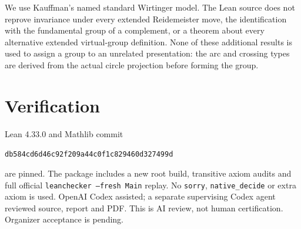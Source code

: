 \documentclass[11pt]{article}
\begin{document}
We use Kauffman's named standard Wirtinger model. The Lean source
does not reprove invariance under every extended Reidemeister move,
the identification with the fundamental group of a complement,
or a theorem about every alternative extended virtual-group
definition. None of these additional results is used to assign a
group to an unrelated presentation: the arc and crossing types are
derived from the actual circle projection before forming the group.

\section{Verification}
Lean 4.33.0 and Mathlib commit
\begin{center}\small\texttt{db584cd6d46c92f209a44c0f1c829460d327499d}\end{center}
are pinned. The package includes a new root build, transitive axiom
audits and full official \texttt{leanchecker --fresh Main} replay.
No \texttt{sorry}, \texttt{native\_decide} or extra axiom is used.
OpenAI Codex assisted; a separate supervising Codex agent reviewed
source, report and PDF. This is AI review, not human certification.
Organizer acceptance is pending.
\end{document}
